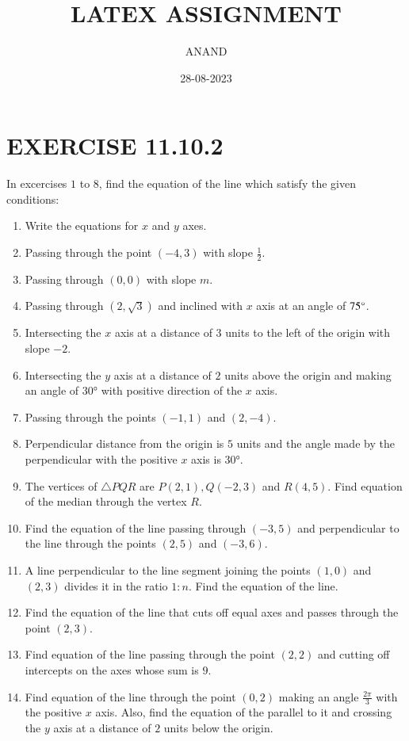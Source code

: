 \documentclass{article}
\theoremstyle{remark}
\begin{document}
\title{LATEX ASSIGNMENT}
\author{ANAND}
\date{28-08-2023}
\maketitle
\section*{EXERCISE 11.10.2}
 In excercises $1$ to $8$, find the equation of the line which satisfy
 the given conditions:
\begin{enumerate}
\item Write the equations for $x$ and $y$ axes.
\item Passing through the point $(-4,3)$ with slope $\frac {1}{2}$.
\item Passing through $(0,0)$ with slope $m$.
\item Passing through $(2,\sqrt {3})$ and inclined with $x$ axis at an angle of $75\degree$.
\item Intersecting the $x$ axis at a distance of $3$ units to the left of the origin with slope $-2$.
\item Intersecting the $y$ axis at a distance of $2$ units above the origin and making an angle of $30°$ with positive direction of the $x$ axis.
\item Passing through the points $(-1,1)$ and $(2,-4)$.
\item Perpendicular distance from the origin is $5$ units and the angle made by the perpendicular with the positive $x$ axis is $30°$. 
\item The vertices of $\triangle PQR$ are $P(2,1), Q(-2,3)$ and $R(4,5)$. Find equation of the median through the vertex $R$.
\item Find the equation of the line passing through $(-3,5)$ and perpendicular to the line through the points $(2,5)$ and $(-3,6)$.
\item A line perpendicular to the line segment joining the points $(1,0)$  and $(2,3)$ divides it in the ratio $1:n$. Find the equation of the line.
\item Find the equation of the line that cuts off equal axes and passes through the point $(2,3)$.
\item Find equation of the line passing through the point $(2,2)$ and cutting off intercepts on the axes whose sum is $9$.
\item Find equation of the line through the point $(0,2)$ making an angle $\frac{2\pi}{3}$ with the positive $x$ axis. Also, find the equation of the parallel to it and crossing the $y$ axis at a distance of $2$ units below the origin.

\end{enumerate}
\end{document}
